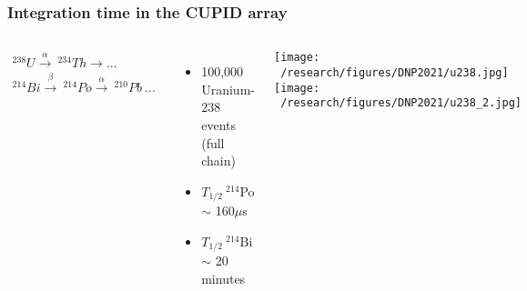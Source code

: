 \documentclass{beamer}
\begin{document}
	\begin{frame}
		\frametitle{Integration time in the CUPID array}
		\begin{columns}[c] %
			
			\begin{eqnarray*}
			^{238}U \xrightarrow{\alpha} \  ^{234}Th \xrightarrow \  ... \\ ^{214}Bi \xrightarrow{\beta} \  ^{214}Po \xrightarrow{\alpha} \ ^{210}Pb \ ...
			\end{eqnarray*}
			\begin{itemize}
				\setlength\itemsep{2em}
				\item 100,000 Uranium-238 events (full chain)
				\item $T_{1/2} \ ^{214}$Po $\sim$ 160$\mu$s
				\item $T_{1/2} \ ^{214}$Bi $\sim$ 20 minutes
			\end{itemize}
			
			\hspace*{0.3cm}\texttt{[image: ~/research/figures/DNP2021/u238.jpg]}
			\medskip\medskip
			\hspace*{0.3cm}\texttt{[image: ~/research/figures/DNP2021/u238\_2.jpg]}
			
		\end{columns}
	\end{frame}

\end{document}
